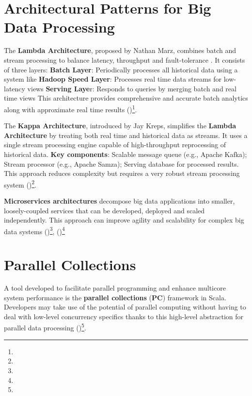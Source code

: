 \section{Architectural Patterns for Big Data Processing}

The \textbf{Lambda Architecture}, proposed by Nathan Marz, combines batch and stream processing to balance latency, throughput and fault-tolerance . It consists of three layers:
\textbf{Batch Layer}: Periodically processes all historical data using a system like \textbf{Hadoop Speed Layer}: Processes real time data streams for low-latency views \textbf{Serving Laye}r: Responds to queries by merging batch and real time views This architecture provides comprehensive and accurate batch analytics along with approximate real time results (\cite{Wingerath2016RealtimeSP})\footnote[29]{}.



The \textbf{Kappa Architecture}, introduced by Jay Kreps, simplifies the \textbf{Lambda Architecture} by treating both real time and historical data as streams. It uses a single stream processing engine capable of high-throughput reprocessing of historical data. \textbf{Key components}: Scalable message queue (e.g., Apache Kafka); Stream processor (e.g., Apache Samza); Serving database for processed results. This approach reduces complexity but requires a very robust stream processing system (\cite{Wingerath2016RealtimeSP})\footnote[29]{}.



\textbf{Microservices architectures} decompose big data applications into smaller, loosely-coupled services that can be developed, deployed and scaled independently. This approach can improve agility and scalability for complex big data systems (\cite{Wingerath2016RealtimeSP})\footnote[29]{}, (\cite{interviewBit})\footnote[39]{}



\section{Parallel Collections}

A tool developed to facilitate parallel programming and enhance multicore system performance is the \textbf{parallel collections} (\textbf{PC}) framework in Scala. Developers may take use of the potential of parallel computing without having to deal with low-level concurrency specifics thanks to this high-level abstraction for parallel data processing (\cite{parallel})\footnote[30]{}.

